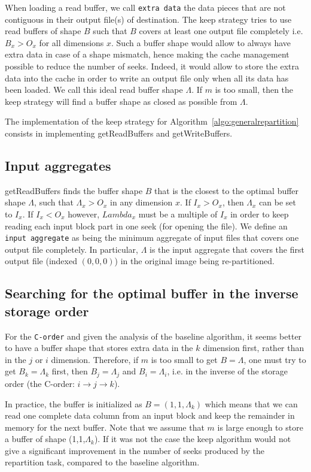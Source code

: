\documentclass[conference]{IEEEtran}
\begin{document}
When loading a read buffer, we call \texttt{extra data} the data pieces that
are not contiguous in their output file(s) of destination.
The keep strategy tries to use read buffers of shape $B$ such that $B$ covers
at least one output file completely i.e. $B_x>O_x$ for all dimensions $x$.
Such a buffer shape would allow to always have extra data in case of a shape
mismatch, hence making the cache management possible to reduce the number of seeks.
Indeed, it would allow to store the extra data into the cache in order to write
an output file only when all its data has been loaded.
We call this ideal read buffer shape $\Lambda$.
If $m$ is too small, then the keep strategy will find a buffer
shape as closed as possible from $\Lambda$.

The implementation of the keep strategy for
Algorithm~\ref{algo:generalrepartition} consists in implementing
getReadBuffers and getWriteBuffers.

\subsection{Input aggregates}
getReadBuffers finds the buffer shape $B$ that is the closest to the optimal buffer
shape $\Lambda$, such that $\Lambda_x>O_x$ in any dimension $x$.
If $I_x > O_x$, then $\Lambda_x$ can be set to $I_x$. If $I_x < O_x$ however,
$Lambda_x$ must be a multiple of $I_x$ in order to keep reading each input
block part in one seek (for opening the file).
We define an \texttt{input aggregate} as being the minimum aggregate of input
files that covers one output file completely. In particular, $\Lambda$ is the
input aggregate that covers the first output file (indexed $(0,0,0)$) in the
original image being re-partitioned.

\subsection{Searching for the optimal buffer in the inverse storage order}

For the \texttt{C-order} and given the analysis of the baseline algorithm,
it seems better to have a buffer shape that stores extra data in the $k$
dimension first, rather than in the $j$ or $i$ dimension.
Therefore, if $m$ is too small to get $B=\Lambda$, one must try to get
$B_k=\Lambda_k$ first, then $B_j=\Lambda_j$ and $B_i=\Lambda_i$, i.e. in the
inverse of the storage order (the C-order: $i\rightarrow j\rightarrow k$).

In practice, the buffer is initialized as $B=(1,1,\Lambda_k)$ which means
that we can read one complete data column from an input block and keep the
remainder in memory for the next buffer.
Note that we assume that $m$ is large enough to store a buffer of shape
(1,1,$\Lambda_k$).
If it was not the case the keep algorithm would not give a significant
improvement in the number of seeks produced by the repartition task, compared
to the baseline algorithm.
\end{document}
